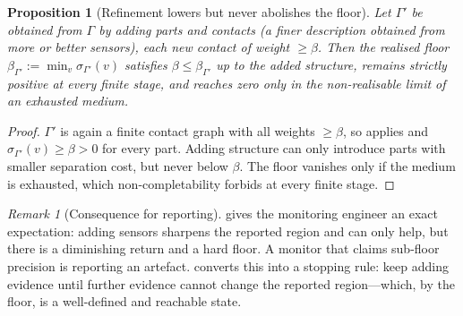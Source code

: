 \documentclass[11pt,twocolumn,a4paper]{article}
\theoremstyle{thmstyle}
\newtheorem{proposition}[theorem]{Proposition}
\theoremstyle{definition}
\theoremstyle{remark}
\newtheorem{remark}[theorem]{Remark}
\newcommand{\floorc}{\beta}
\newcommand{\Gph}{\Gamma}
\begin{document}
\begin{proposition}[Refinement lowers but never abolishes the floor]
\label{prop:refine}
Let $\Gph'$ be obtained from $\Gph$ by adding parts and contacts (a finer
description obtained from more or better sensors), each new contact of
weight $\ge\floorc$. Then the realised floor
$\floorc_{\Gph'}:=\min_{v}\sigma_{\Gph'}(v)$ satisfies
$\floorc\le\floorc_{\Gph'}$ up to the added structure, remains strictly
positive at every finite stage, and reaches zero only in the
non-realisable limit of an exhausted medium.
\end{proposition}

\begin{proof}
$\Gph'$ is again a finite contact graph with all weights $\ge\floorc$, so
 applies and $\sigma_{\Gph'}(v)\ge\floorc>0$ for every part.
Adding structure can only introduce parts with smaller separation cost, but
never below $\floorc$. The floor vanishes only if the medium is exhausted,
which non-completability forbids at every finite stage.
\end{proof}

\begin{remark}[Consequence for reporting]
\label{rem:report}
 gives the monitoring engineer an exact expectation:
adding sensors sharpens the reported region and can only help, but there is
a diminishing return and a hard floor. A monitor that claims sub-floor
precision is reporting an artefact.  converts this into
a stopping rule: keep adding evidence until further evidence cannot change
the reported region---which, by the floor, is a well-defined and reachable
state.
\end{remark}
\end{document}
